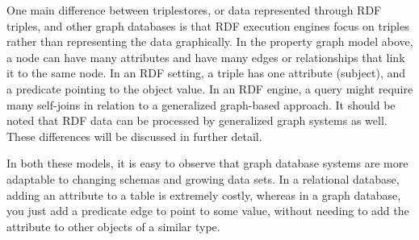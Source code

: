 One main difference between triplestores, or data represented through RDF triples, and other graph databases is that RDF execution engines focus on triples rather than representing the data graphically. In the property graph model above, a node can have many attributes and have many edges or relationships that link it to the same node. In an RDF setting, a triple has one attribute (subject), and a predicate pointing to the object value. In an RDF engine, a query might require many self-joins in relation to a generalized graph-based approach\cite{RDFvsGraph}. It should be noted that RDF data can be processed by generalized graph systems as well. These differences will be discussed in further detail. 


In both these models, it is easy to observe that graph database systems are more adaptable to changing schemas and growing data sets. In a relational database, adding an attribute to a table is extremely costly, whereas in a graph database, you just add a predicate edge to point to some value, without needing to add the attribute to other objects of a similar type.






